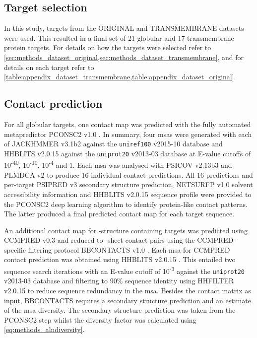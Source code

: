 \subsection{Target selection}
In this study, targets from the ORIGINAL and TRANSMEMBRANE datasets were used. This resulted in a final set of 21 globular and 17 transmembrane protein targets. For details on how the targets were selected refer to \cref{sec:methods_dataset_original,sec:methods_dataset_transmembrane}, and for details on each target refer to \cref{table:appendix_dataset_transmembrane,table:appendix_dataset_original}.

\subsection{Contact prediction} \label{sec:ample_proof_conpred}
For all globular targets, one contact map was predicted with the fully automated metapredictor PCONSC2 v1.0 \cite{Skwark2014-qp}. In summary, four \gls{msa}s were generated with each of JACKHMMER v3.1b2 \cite{Johnson2010-uz} against the \texttt{uniref100} v2015-10 database and HHBLITS v2.0.15 \cite{Remmert2011-kt} against the \texttt{uniprot20} v2013-03 database \cite{The_UniProt_Consortium2017-pb} at E-value cutoffs of 10\textsuperscript{-40}, 10\textsuperscript{-10}, 10\textsuperscript{-4} and 1. Each \gls{msa} was analysed with PSICOV v2.13b3 \cite{Jones2012-ks} and PLMDCA v2 \cite{Ekeberg2014-kf} to produce 16 individual contact predictions. All 16 predictions and per-target PSIPRED v3 \cite{Jones1999-ed} secondary structure prediction, NETSURFP v1.0 \cite{Petersen2009-wy} solvent accessibility information and HHBLITS v2.0.15 \cite{Remmert2011-kt} sequence profile were provided to the PCONSC2 deep learning algorithm \cite{Skwark2014-qp} to identify protein-like contact patterns. The latter produced a final predicted contact map for each target sequence.

An additional contact map for \textbeta-structure containing targets was predicted using CCMPRED v0.3 \cite{Seemayer2014-zp} and reduced to \textbeta-sheet contact pairs using the CCMPRED-specific filtering protocol BBCONTACTS v1.0 \cite{Andreani2015-qn}. Each \gls{msa} for CCMPRED contact prediction was obtained using HHBLITS v2.0.15 \cite{Remmert2011-kt}. This entailed two sequence search iterations with an E-value cutoff of 10\textsuperscript{-3} against the \texttt{uniprot20} v2013-03 database \cite{The_UniProt_Consortium2017-pb} and filtering to 90\% sequence identity using HHFILTER v2.0.15 \cite{Remmert2011-kt} to reduce sequence redundancy in the \gls{msa}. Besides the contact matrix as input, BBCONTACTS requires a secondary structure prediction and an estimate of the \gls{msa} diversity. The secondary structure prediction was taken from the PCONSC2 step whilst the diversity factor was calculated using \cref{eq:methods_alndiversity}.

